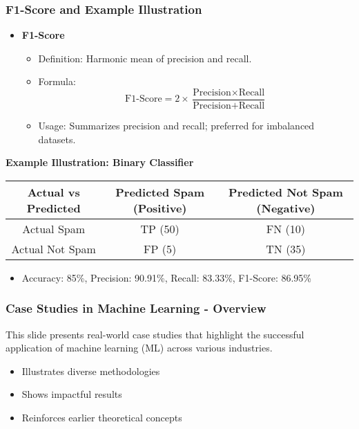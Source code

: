 \documentclass[aspectratio=169]{beamer}
\begin{document}
\begin{frame}[fragile]
    \frametitle{F1-Score and Example Illustration}
    \begin{itemize}
        \item \textbf{F1-Score}
        \begin{itemize}
            \item Definition: Harmonic mean of precision and recall.
            \item Formula: 
            \begin{equation}
            \text{F1-Score} = 2 \times \frac{\text{Precision} \times \text{Recall}}{\text{Precision} + \text{Recall}}
            \end{equation}
            \item Usage: Summarizes precision and recall; preferred for imbalanced datasets.
        \end{itemize}
    \end{itemize}
    
    \textbf{Example Illustration: Binary Classifier}
    \begin{table}[ht]
        \centering
        \begin{tabular}{|c|c|c|}
            \hline
            \textbf{Actual vs Predicted} & \textbf{Predicted Spam (Positive)} & \textbf{Predicted Not Spam (Negative)} \\
            \hline
            Actual Spam                   & TP (50)                           & FN (10)                             \\
            Actual Not Spam               & FP (5)                            & TN (35)                             \\
            \hline
        \end{tabular}
    \end{table}
    
    \begin{itemize}
        \item Accuracy: 85\%, Precision: 90.91\%, Recall: 83.33\%, F1-Score: 86.95\%
    \end{itemize}
\end{frame}

\begin{frame}[fragile]
    \frametitle{Case Studies in Machine Learning - Overview}
    This slide presents real-world case studies that highlight the successful application of machine learning (ML) across various industries. 
    \begin{itemize}
        \item Illustrates diverse methodologies
        \item Shows impactful results 
        \item Reinforces earlier theoretical concepts
    \end{itemize}
\end{frame}
\end{document}
